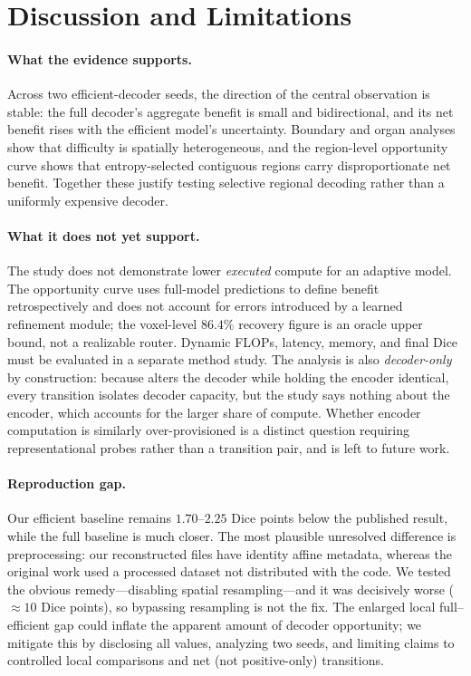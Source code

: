 \section{Discussion and Limitations}
\label{sec:discussion}

\paragraph{What the evidence supports.}
Across two efficient-decoder seeds, the direction of the central observation is
stable: the full decoder's aggregate benefit is small and bidirectional, and its
net benefit rises with the efficient model's uncertainty.  Boundary and organ
analyses show that difficulty is spatially heterogeneous, and the region-level
opportunity curve shows that entropy-selected contiguous regions carry
disproportionate net benefit.  Together these justify testing selective regional
decoding rather than a uniformly expensive decoder.

\paragraph{What it does not yet support.}
The study does not demonstrate lower \emph{executed} compute for an adaptive
model.  The opportunity curve uses full-model predictions to define benefit
retrospectively and does not account for errors introduced by a learned
refinement module; the voxel-level $86.4\%$ recovery figure is an oracle upper
bound, not a realizable router.  Dynamic FLOPs, latency, memory, and final Dice
must be evaluated in a separate method study.  The analysis is also
\emph{decoder-only} by construction: because \method{} alters the decoder while
holding the encoder identical, every transition isolates decoder capacity, but
the study says nothing about the encoder, which accounts for the larger share of
compute.  Whether encoder computation is similarly over-provisioned is a distinct
question requiring representational probes rather than a transition pair, and is
left to future work.

\paragraph{Reproduction gap.}
Our efficient baseline remains $1.70$--$2.25$ Dice points below the published
result, while the full baseline is much closer.  The most plausible unresolved
difference is preprocessing: our reconstructed files have identity affine
metadata, whereas the original work used a processed dataset not distributed with
the code.  We tested the obvious remedy---disabling spatial resampling---and it
was decisively worse ($\approx\!10$ Dice points), so bypassing resampling is not
the fix.  The enlarged local full--efficient gap could inflate the apparent
amount of decoder opportunity; we mitigate this by disclosing all values,
analyzing two seeds, and limiting claims to controlled local comparisons and net
(not positive-only) transitions.


